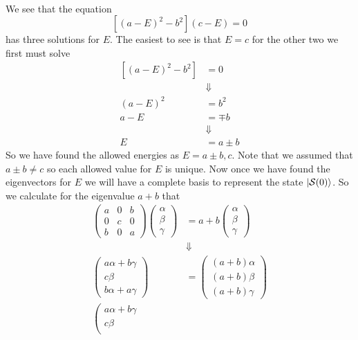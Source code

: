 \documentclass[11pt]{article}
\numberwithin{equation}{section}
\begin{document}
\begin{enumerate}[(a)]
\begin{align*}
\end{align*}
We see that the equation 
$$\left[(a-E)^2-b^2\right](c-E) = 0$$
has three solutions for $E$. The easiest to see is that $E = c$ for the other two we first must solve
\begin{align*}
\left[(a-E)^2-b^2\right] &= 0\\
&\Downarrow\\
(a-E)^2 &= b^2\\
a-E &= \mp b\\
&\Downarrow\\
E &= a\pm b
\end{align*}
So we have found the allowed energies as $E = a\pm b, c$. Note that we assumed that $a\pm b \ne c$ so each allowed value for $E$ is unique. Now once we have found the eigenvectors for $E$ we will have a complete basis to represent the state $|{\mathcal{S}(0)}\rangle$. So we calculate for the eigenvalue $a+b$ that
\begin{align*}
\left(\begin{array}{ccc}
               a    &0    &b\\
               0    &c    &0\\
               b    &0    &a
\end{array}\right)\left(\begin{array}{c}\alpha\\ \beta\\ \gamma\end{array}\right) &= a+b\left(\begin{array}{c}\alpha\\ \beta\\ \gamma\end{array}\right)\\
&\Downarrow\\
\left(\begin{array}{c}a\alpha+b\gamma\\ 
                      c\beta\\ 
                      b\alpha+a\gamma\end{array}\right) 
&= \left(\begin{array}{c}(a+b)\alpha\\ 
                         (a+b)\beta\\ 
                         (a+b)\gamma\end{array}\right)\\
\left(\begin{array}{c}a\alpha+b\gamma\\ 
                      c\beta\\ 

\end{array}
\end{align*}
\end{enumerate}
\end{document}
